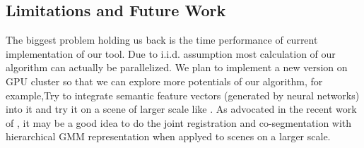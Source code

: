 \subsection{Limitations and Future Work}
The biggest problem holding us back is the time performance of current implementation of our tool.  Due to i.i.d. assumption most calculation of our algorithm can actually be parallelized. We plan to implement a new version on GPU cluster so that we can explore more potentials of our algorithm, for example,Try to integrate semantic feature vectors (generated by neural networks) into it and try it on a scene of larger scale like \cite{GOGMA}. As advocated in the recent work of \cite{AGM}, it may be a good idea to do the joint registration and co-segmentation with hierarchical GMM representation when applyed to scenes on a larger scale. 